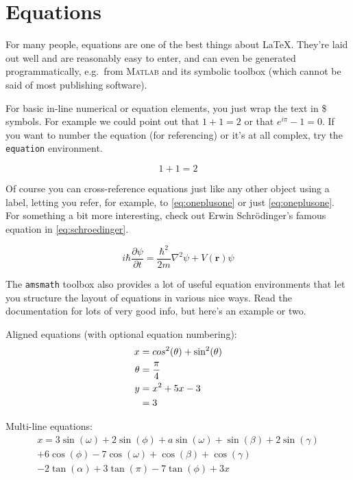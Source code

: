 
\section{Equations}\label{sec:equations}

For many people, equations are one of the best things about \LaTeX{}. They're laid out well and are reasonably easy to enter, and can even be generated programmatically, e.g.~from \textsc{Matlab} and its symbolic toolbox (which cannot be said of most publishing software).

For basic in-line numerical or equation elements, you just wrap the text in \$ symbols. For example we could point out that $1+1=2$ or that $e^{i\pi}-1=0$. If you want to number the equation (for referencing) or it's at all complex, try the \texttt{equation} environment.

\begin{equation}
    \label{eq:oneplusone}
    1 + 1 = 2
\end{equation}

Of course you can cross-reference equations just like any other object using a label, letting you refer, for example, to \autoref{eq:oneplusone} or just \eqref{eq:oneplusone}. For something a bit more interesting, check out Erwin Schr\"{o}dinger's famous equation in \autoref{eq:schroedinger}.

\begin{equation}
    \label{eq:schroedinger}
    i\hbar\frac{\partial\psi}{\partial t} = \frac{\hbar^2}{2m}\nabla^2\psi + V(\mathbf{r})\psi
\end{equation}

The \texttt{amsmath} toolbox also provides a lot of useful equation environments that let you structure the layout of equations in various nice ways. Read the documentation for lots of very good info, but here's an example or two.

Aligned equations (with optional equation numbering):
\begin{align}
    x &= cos^2(\theta) + \sin^2(\theta) \\
    \theta &= \frac{\pi}{4} \\
    y &= x^2 + 5x - 3 \label{eq:before} \\
    &= 3 \notag
\end{align}

Multi-line equations:
\begin{multline}
    x = 3\sin(\omega) + 2\sin(\phi) + a\sin(\omega) + \sin(\beta) + 2\sin(\gamma) \\
    + 6\cos(\phi) - 7\cos(\omega) + \cos(\beta) + \cos(\gamma) \\
    - 2\tan(\alpha) + 3\tan(\pi) - 7\tan(\phi) + 3x
\end{multline}

